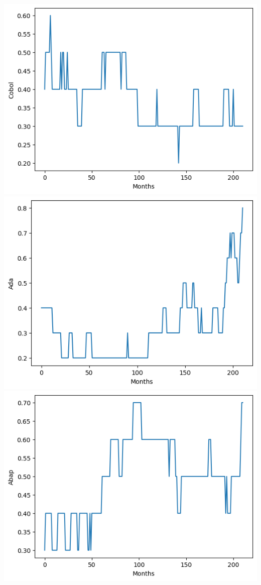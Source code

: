 \documentclass[conference]{IEEEtran}
\begin{document}
\includegraphics[scale=0.4]{lineplot/cobol.png}
\includegraphics[scale=0.4]{lineplot/ada.png}
\includegraphics[scale=0.4]{lineplot/abap.png}
\end{document}
